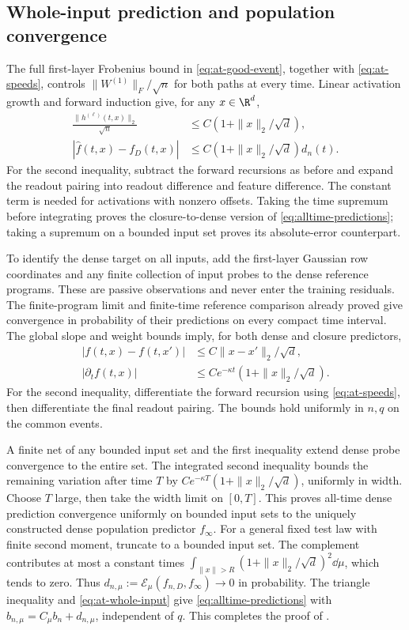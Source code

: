 \subsection{Whole-input prediction and population convergence}

The full first-layer Frobenius bound in \eqref{eq:at-good-event}, together
with \eqref{eq:at-speeds}, controls $\|W^{(1)}\|_F/\sqrt n$ for both
paths at every time.  Linear activation growth and forward induction give,
for any $x\in\R^d$,
\begin{align}
 \frac{\|h^{(\ell)}(t,x)\|_2}{\sqrt n}
       &\le C(1+\|x\|_2/\sqrt d),\nonumber\\
 |\widehat f(t,x)-f_D(t,x)|
       &\le C(1+\|x\|_2/\sqrt d)d_n(t).
 \label{eq:at-whole-input}
\end{align}
For the second inequality, subtract the forward recursions as before and
expand the readout pairing into readout difference and feature difference.
The constant term is needed for activations with nonzero offsets.
Taking the time supremum before integrating proves the closure-to-dense
version of \eqref{eq:alltime-predictions}; taking a supremum on a bounded
input set proves its absolute-error counterpart.

To identify the dense target on all inputs, add the first-layer Gaussian
row coordinates and any finite collection of input probes to the dense
reference programs.  These are passive observations and never enter the
training residuals.  The finite-program limit and finite-time reference
comparison already proved give convergence in probability of their
predictions on every compact time interval.  The global slope and weight
bounds imply, for both dense and closure predictors,
\begin{align}
 |f(t,x)-f(t,x')|&\le C\|x-x'\|_2/\sqrt d,\nonumber\\
 |\partial_t f(t,x)|&\le Ce^{-\kappa t}(1+\|x\|_2/\sqrt d).
 \label{eq:at-predictor-equicontinuity}
\end{align}
For the second inequality, differentiate the forward recursion using
\eqref{eq:at-speeds}, then differentiate the final readout pairing.
The bounds hold uniformly in $n,q$ on the common events.

A finite net of any bounded input set and the first inequality extend
dense probe convergence to the entire set.  The integrated second
inequality bounds the remaining variation after time $T$ by
$Ce^{-\kappa T}(1+\|x\|_2/\sqrt d)$, uniformly in width.  Choose $T$
large, then take the width limit on $[0,T]$.  This proves all-time dense
prediction convergence uniformly on bounded input sets to the uniquely
constructed dense population predictor $f_\infty$.
For a general fixed test law with finite second moment, truncate to a
bounded input set.  The complement contributes at most a constant times
$\int_{\|x\|>R}(1+\|x\|_2/\sqrt d)^2\dd\mu$, which tends to zero.
Thus $d_{n,\mu}:=\mathcal E_\mu(f_{n,D},f_\infty)\to0$ in probability.
The triangle inequality and \eqref{eq:at-whole-input} give
\eqref{eq:alltime-predictions} with
$b_{n,\mu}=C_\mu b_n+d_{n,\mu}$, independent of $q$.
This completes the proof of .

